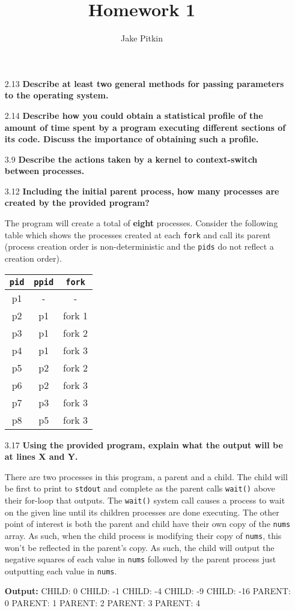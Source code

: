 \documentclass[fleqn]{hw}
\title{Homework 1}
\institute{University of Utah}
\author{Jake Pitkin}
\begin{document}
\maketitle

\begin{enumerate}

\item [2.13] \textbf{Describe at least two general methods for passing parameters to the operating system.}
\item [2.14] \textbf{Describe how you could obtain a statistical profile of the amount of time spent by a program executing different sections of its code. Discuss the importance of obtaining such a profile.}
\item [3.9] \textbf{Describe the actions taken by a kernel to context-switch between processes.}
\item [3.12] \textbf{Including the initial parent process, how many processes are created by the provided program?}

The program will create a total of \textbf{eight} processes. Consider the following table which shows the processes created at each \texttt{fork} and call its parent (process creation order is non-deterministic and the \texttt{pids} do not reflect a creation order).

\begin{table}[H]
\centering
{\renewcommand{\arraystretch}{1.2}%
\begin{tabular}{| c | c | c |}
\hline
\texttt{pid} & \texttt{ppid} & \texttt{fork} \\
\hline
p1 & - & - \\ \hline
p2 & p1 & fork 1 \\ \hline
p3 & p1 & fork 2 \\ \hline
p4 & p1 & fork 3 \\ \hline
p5 & p2 & fork 2 \\ \hline
p6 & p2 & fork 3 \\ \hline
p7 & p3 & fork 3 \\ \hline
p8 & p5 & fork 3 \\ \hline
\end{tabular}}
\end{table}

\item [3.17] \textbf{Using the provided program, explain what the output will be at lines X and Y.}

There are two processes in this program, a parent and a child. The child will be first to print to \texttt{stdout} and complete as the parent calls \texttt{wait()} above their for-loop that outputs. The \texttt{wait()} system call causes a process to wait on the given line until its children processes are done executing. The other point of interest is both the parent and child have their own copy of the \texttt{nums} array. As such, when the child process is modifying their copy of \texttt{nums}, this won't be reflected in the parent's copy. As such, the child will output the negative squares of each value in \texttt{nums} followed by the parent process just outputting each value in \texttt{nums}.

\textbf{Output:} CHILD: 0 CHILD: -1 CHILD: -4 CHILD: -9 CHILD: -16 PARENT: 0 PARENT: 1 PARENT: 2 PARENT: 3 PARENT: 4

\end{enumerate}
\end{document}
